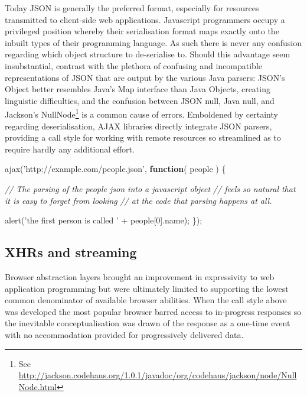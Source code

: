 \documentclass[12pt, ]{article}
\newenvironment{Shaded}{}{}
\newcommand{\KeywordTok}[1]{\textcolor[rgb]{0.00,0.44,0.13}{\textbf{{#1}}}}
\newcommand{\DecValTok}[1]{\textcolor[rgb]{0.25,0.63,0.44}{{#1}}}
\newcommand{\StringTok}[1]{\textcolor[rgb]{0.25,0.44,0.63}{{#1}}}
\newcommand{\CommentTok}[1]{\textcolor[rgb]{0.38,0.63,0.69}{\textit{{#1}}}}
\newcommand{\FunctionTok}[1]{\textcolor[rgb]{0.02,0.16,0.49}{{#1}}}
\newcommand{\NormalTok}[1]{{#1}}
\begin{document}
Today JSON is generally the preferred format, especially for resources
transmitted to client-side web applications. Javascript programmers
occupy a privileged position whereby their serialisation format maps
exactly onto the inbuilt types of their programming language. As such
there is never any confusion regarding which object structure to
de-serialise to. Should this advantage seem insubstantial, contrast with
the plethora of confusing and incompatible representations of JSON that
are output by the various Java parsers: JSON's Object better resembles
Java's Map interface than Java Objects, creating linguistic
difficulties, and the confusion between JSON null, Java null, and
Jackson's NullNode\footnote{See
  \url{http://jackson.codehaus.org/1.0.1/javadoc/org/codehaus/jackson/node/NullNode.html}}
is a common cause of errors. Emboldened by certainty regarding
deserialisation, AJAX libraries directly integrate JSON parsers,
providing a call style for working with remote resources so streamlined
as to require hardly any additional effort.

\begin{Shaded}
\begin{Highlighting}[]
\FunctionTok{ajax}\NormalTok{(}\StringTok{'http://example.com/people.json'}\NormalTok{, }\KeywordTok{function}\NormalTok{( people ) \{}

   \CommentTok{// The parsing of the people json into a javascript object}
   \CommentTok{// feels so natural that it is easy to forget from looking }
   \CommentTok{// at the code that parsing happens at all. }
   
   \FunctionTok{alert}\NormalTok{(}\StringTok{'the first person is called '} \NormalTok{+ people[}\DecValTok{0}\NormalTok{].}\FunctionTok{name}\NormalTok{);}
\NormalTok{\});}
\end{Highlighting}
\end{Shaded}

\subsection{XHRs and streaming}\label{xhrs-and-streaming}

\label{xhrsandstreaming}

Browser abstraction layers brought an improvement in expressivity to web
application programming but were ultimately limited to supporting the
lowest common denominator of available browser abilities. When the call
style above was developed the most popular browser barred access to
in-progress responses so the inevitable conceptualisation was drawn of
the response as a one-time event with no accommodation provided for
progressively delivered data.
\end{document}
